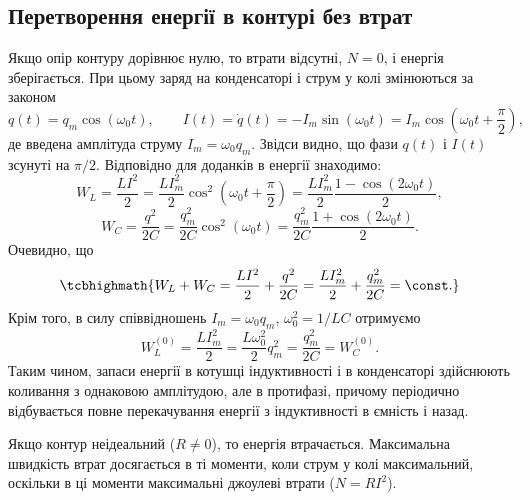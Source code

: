 \subsection*{Перетворення енергії в контурі без втрат}

Якщо опір контуру дорівнює нулю, то втрати відсутні,
$N = 0$, і енергія зберігається. При цьому заряд на конденсаторі і струм у
колі змінюються за законом
\begin{equation}\label{eq:lossless_oscillations}
	q(t) = q_m \cos(\omega_0 t), \qquad
	I(t) = \dot{q}(t) = -I_m \sin(\omega_0 t) = I_m \cos\left(\omega_0 t + \frac{\pi}{2}\right),
\end{equation}
де введена амплітуда струму $I_m = \omega_0 q_m$. Звідси видно, що фази $q(t)$ і
$I(t)$ зсунуті на $\pi/2$. Відповідно для доданків в енергії знаходимо:
\begin{equation}\label{eq:WL_WC_oscillations}
	W_L = \frac{LI^2}{2} = \frac{LI_m^2}{2} \cos^2\left(\omega_0 t + \frac{\pi}{2}\right) = \frac{LI_m^2}{2} \frac{1 - \cos(2\omega_0 t)}{2},
\end{equation}
\begin{equation}\label{eq:WC_oscillations}
	W_C = \frac{q^2}{2C} = \frac{q_m^2}{2C} \cos^2(\omega_0 t) = \frac{q_m^2}{2C} \frac{1 + \cos(2\omega_0 t)}{2}.
\end{equation}
Очевидно, що
\begin{equation}\label{eq:energy_conservation}
	\tcbhighmath{
		W_L + W_C = \frac{LI^2}{2} + \frac{q^2}{2C} = \frac{LI_m^2}{2} + \frac{q_m^2}{2C} = \const.
	}
\end{equation}
Крім того, в силу співвідношень $I_m = \omega_0 q_m$, $\omega_0^2 = 1/LC$ отримуємо
\begin{equation}\label{eq:energy_amplitudes}
	W_L^{(0)} = \frac{LI_m^2}{2} = \frac{L\omega_0^2}{2} q_m^2 = \frac{q_m^2}{2C} = W_C^{(0)}.
\end{equation}
Таким чином, запаси енергії в котушці індуктивності і в конденсаторі здійснюють коливання з однаковою амплітудою, але в протифазі,
причому періодично відбувається повне перекачування енергії з індуктивності в ємність і назад.

Якщо контур неідеальний ($R \neq 0$), то енергія втрачається. Максимальна швидкість втрат досягається в ті моменти, коли струм у колі
максимальний, оскільки в ці моменти максимальні джоулеві втрати
($N = RI^2$).

